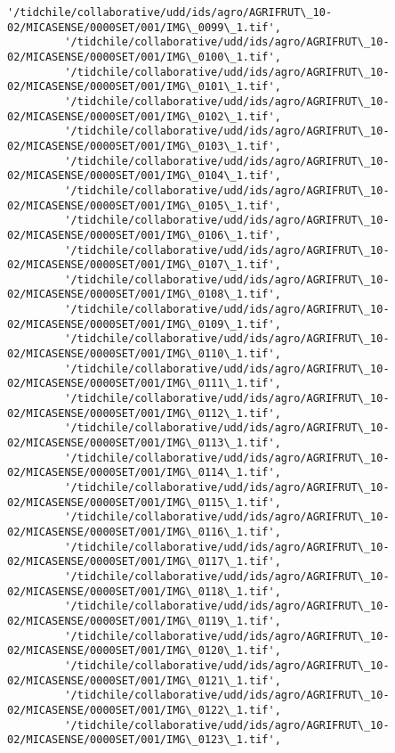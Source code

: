 \documentclass[11pt]{article}
\begin{document}
\begin{Verbatim}[commandchars=\\\{\}]
         '/tidchile/collaborative/udd/ids/agro/AGRIFRUT\_10-02/MICASENSE/0000SET/001/IMG\_0099\_1.tif',
         '/tidchile/collaborative/udd/ids/agro/AGRIFRUT\_10-02/MICASENSE/0000SET/001/IMG\_0100\_1.tif',
         '/tidchile/collaborative/udd/ids/agro/AGRIFRUT\_10-02/MICASENSE/0000SET/001/IMG\_0101\_1.tif',
         '/tidchile/collaborative/udd/ids/agro/AGRIFRUT\_10-02/MICASENSE/0000SET/001/IMG\_0102\_1.tif',
         '/tidchile/collaborative/udd/ids/agro/AGRIFRUT\_10-02/MICASENSE/0000SET/001/IMG\_0103\_1.tif',
         '/tidchile/collaborative/udd/ids/agro/AGRIFRUT\_10-02/MICASENSE/0000SET/001/IMG\_0104\_1.tif',
         '/tidchile/collaborative/udd/ids/agro/AGRIFRUT\_10-02/MICASENSE/0000SET/001/IMG\_0105\_1.tif',
         '/tidchile/collaborative/udd/ids/agro/AGRIFRUT\_10-02/MICASENSE/0000SET/001/IMG\_0106\_1.tif',
         '/tidchile/collaborative/udd/ids/agro/AGRIFRUT\_10-02/MICASENSE/0000SET/001/IMG\_0107\_1.tif',
         '/tidchile/collaborative/udd/ids/agro/AGRIFRUT\_10-02/MICASENSE/0000SET/001/IMG\_0108\_1.tif',
         '/tidchile/collaborative/udd/ids/agro/AGRIFRUT\_10-02/MICASENSE/0000SET/001/IMG\_0109\_1.tif',
         '/tidchile/collaborative/udd/ids/agro/AGRIFRUT\_10-02/MICASENSE/0000SET/001/IMG\_0110\_1.tif',
         '/tidchile/collaborative/udd/ids/agro/AGRIFRUT\_10-02/MICASENSE/0000SET/001/IMG\_0111\_1.tif',
         '/tidchile/collaborative/udd/ids/agro/AGRIFRUT\_10-02/MICASENSE/0000SET/001/IMG\_0112\_1.tif',
         '/tidchile/collaborative/udd/ids/agro/AGRIFRUT\_10-02/MICASENSE/0000SET/001/IMG\_0113\_1.tif',
         '/tidchile/collaborative/udd/ids/agro/AGRIFRUT\_10-02/MICASENSE/0000SET/001/IMG\_0114\_1.tif',
         '/tidchile/collaborative/udd/ids/agro/AGRIFRUT\_10-02/MICASENSE/0000SET/001/IMG\_0115\_1.tif',
         '/tidchile/collaborative/udd/ids/agro/AGRIFRUT\_10-02/MICASENSE/0000SET/001/IMG\_0116\_1.tif',
         '/tidchile/collaborative/udd/ids/agro/AGRIFRUT\_10-02/MICASENSE/0000SET/001/IMG\_0117\_1.tif',
         '/tidchile/collaborative/udd/ids/agro/AGRIFRUT\_10-02/MICASENSE/0000SET/001/IMG\_0118\_1.tif',
         '/tidchile/collaborative/udd/ids/agro/AGRIFRUT\_10-02/MICASENSE/0000SET/001/IMG\_0119\_1.tif',
         '/tidchile/collaborative/udd/ids/agro/AGRIFRUT\_10-02/MICASENSE/0000SET/001/IMG\_0120\_1.tif',
         '/tidchile/collaborative/udd/ids/agro/AGRIFRUT\_10-02/MICASENSE/0000SET/001/IMG\_0121\_1.tif',
         '/tidchile/collaborative/udd/ids/agro/AGRIFRUT\_10-02/MICASENSE/0000SET/001/IMG\_0122\_1.tif',
         '/tidchile/collaborative/udd/ids/agro/AGRIFRUT\_10-02/MICASENSE/0000SET/001/IMG\_0123\_1.tif',

\end{Verbatim}
\end{document}
